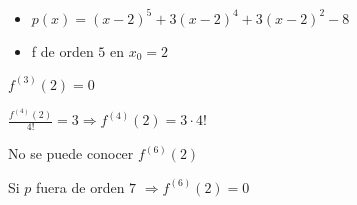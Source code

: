 \documentclass[../practica_05.tex]{subfiles}
\begin{document}
    \begin{itemize}
        \item $p(x) = (x-2)^5 + 3(x-2)^4+ 3(x-2)^2 - 8$
        \item f de orden $5$ en $x_0=2$
    \end{itemize}

    $f^{(3)}(2) = 0$

    $\frac{f^{(4)}(2)}{4!} = 3 \Rightarrow f^{(4)}(2) = 3 \cdot 4!$

    No se puede conocer $f^{(6)}(2)$

    Si $p$ fuera de orden $7$ $\Rightarrow f^{(6)}(2) = 0$
\end{document}
